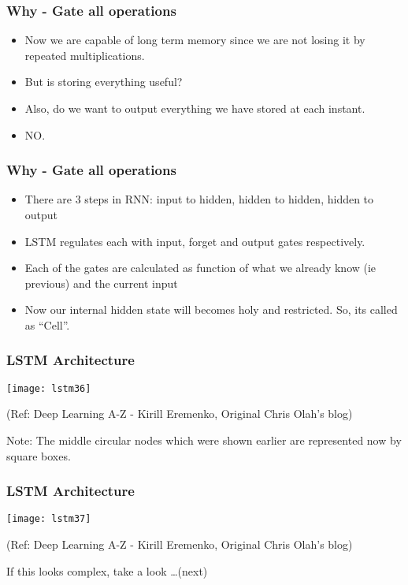 \begin{frame}[fragile] \frametitle{Why - Gate all operations}
\begin{itemize}
\item Now we are capable of long term memory since we are not losing it by repeated multiplications.
\item But is storing everything useful?
\item Also, do we want to output everything we have stored at each instant.
\item NO.
\end{itemize}
\end{frame}

\begin{frame}[fragile] \frametitle{Why - Gate all operations}
\begin{itemize}
\item There are 3 steps in RNN: input to hidden, hidden to hidden, hidden to output
\item LSTM regulates each with input, forget and output gates respectively.
\item Each of the gates are calculated as function of what we already know (ie previous) and the current input
\item Now our internal hidden state will becomes holy and restricted. So, its called as ``Cell''.
\end{itemize}
\end{frame}


\begin{frame}[fragile] \frametitle{LSTM Architecture}
\begin{center}
\texttt{[image: lstm36]}

\tiny{(Ref: Deep Learning A-Z - Kirill Eremenko, Original Chris Olah's blog)}
\end{center}

Note: The middle circular nodes which were shown earlier are represented now by square boxes.
\end{frame}

\begin{frame}[fragile] \frametitle{LSTM Architecture}
\begin{center}
\texttt{[image: lstm37]}

\tiny{(Ref: Deep Learning A-Z - Kirill Eremenko, Original Chris Olah's blog)}
\end{center}

If this looks complex, take a look \ldots (next)

\end{frame}

